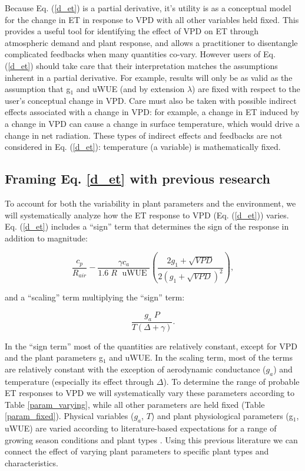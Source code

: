 \documentclass[draft]{agujournal2019}
\begin{document}
  Because Eq. (\ref{d_et}) is a partial derivative, it's utility is as
  a conceptual model for the change in ET in response to VPD with all
  other variables held fixed. This provides a useful tool for
  identifying the effect of VPD on ET through atmospheric demand and
  plant response, and allows a practitioner to disentangle complicated
  feedbacks when many quantities co-vary. However users of
  Eq. (\ref{d_et}) should take care that their interpretation matches
  the assumptions inherent in a partial derivative. For example,
  results will only be as valid as the assumption that g$_1$ and uWUE
  (and by extension $\lambda$) are fixed with respect to the user's
  conceptual change in VPD. Care must also be taken with possible
  indirect effects associated with a change in VPD: for example, a
  change in ET induced by a change in VPD can cause a change in
  surface temperature, which would drive a change in net
  radiation. These types of indirect effects and feedbacks are not
  considered in Eq. (\ref{d_et}): temperature (a variable) is
  mathematically fixed.

\subsection{Framing Eq. \ref{d_et} with previous research }


  To account for both the variability in plant parameters and the
  environment, we will systematically analyze how the ET response to
  VPD (Eq. (\ref{d_et})) varies. Eq. (\ref{d_et}) includes a
  ``sign'' term that determines the sign of the response in addition
  to magnitude:

\begin{equation}
  \label{sign}
  \frac{c_p}{R_{air}} - \frac{\gamma c_a }{1.6 \; R\; \text{ uWUE }} \left( \frac{2 g_1 + \sqrt{VPD}}{2 (g_1 + \sqrt{VPD})^2}\right),
\end{equation}

and a ``scaling'' term multiplying the ``sign'' term:

\begin{equation}
  \frac{g_a \; P}{T(\Delta + \gamma)}.
\end{equation}

In the ``sign term'' most of the quantities are relatively constant,
except for VPD and the plant parameters g$_1$ and uWUE. In the scaling
term, most of the terms are relatively constant with the exception of
aerodynamic conductance ($g_a$) and temperature (especially its effect
through $\Delta$). To determine the range of probable ET responses to
VPD we will systematically vary these parameters according to Table
\ref{param_varying}, while all other parameters are held fixed (Table
\ref{param_fixed}). Physical variables ($g_a$, $T$) and plant
physiological parameters (g$_1$, uWUE) are varied according to
literature-based expectations for a range of growing season conditions
and plant types \cite{Zhou_2015, Medlyn_2017}. Using this previous
literature we can connect the effect of varying plant parameters to
specific plant types and characteristics.
\end{document}
